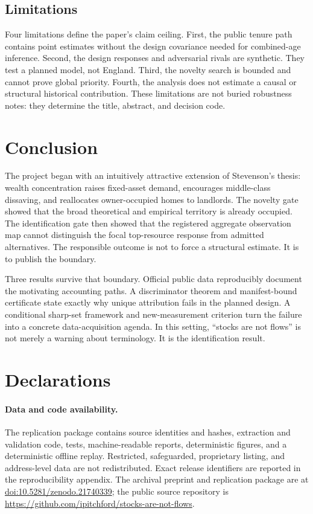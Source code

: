 \documentclass[11pt]{article}
\begin{document}
\subsection{Limitations}

Four limitations define the paper's claim ceiling. First, the public tenure path
contains point estimates without the design covariance needed for combined-age
inference. Second, the design responses and adversarial rivals are synthetic.
They test a planned model, not England. Third, the novelty search is bounded and
cannot prove global priority. Fourth, the analysis does not estimate a causal or
structural historical contribution. These limitations are not buried robustness
notes: they determine the title, abstract, and decision code.

\section{Conclusion}

The project began with an intuitively attractive extension of Stevenson's thesis:
wealth concentration raises fixed-asset demand, encourages middle-class dissaving,
and reallocates owner-occupied homes to landlords. The novelty gate showed that
the broad theoretical and empirical territory is already occupied. The
identification gate then showed that the registered aggregate observation map
cannot distinguish the focal top-resource response from admitted alternatives.
The responsible outcome is not to force a structural estimate. It is to publish
the boundary.

Three results survive that boundary. Official public data reproducibly document
the motivating accounting paths. A discriminator theorem and manifest-bound
certificate state exactly why unique attribution fails in the planned design. A
conditional sharp-set framework and new-measurement criterion turn the failure
into a concrete data-acquisition agenda. In this setting, ``stocks are not flows''
is not merely a warning about terminology. It is the identification result.

\section*{Declarations}

\paragraph{Data and code availability.}
The replication package contains source identities and hashes, extraction and
validation code, tests, machine-readable reports, deterministic figures, and a
deterministic offline replay. Restricted, safeguarded, proprietary listing, and
address-level data are not redistributed. Exact release identifiers are reported
in the reproducibility appendix. The archival preprint and replication package
are at \href{https://doi.org/10.5281/zenodo.21740339}{doi:10.5281/zenodo.21740339};
the public source repository is
\url{https://github.com/ipitchford/stocks-are-not-flows}.
\end{document}
